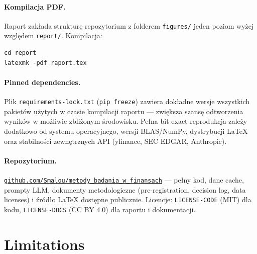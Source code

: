 \documentclass[11pt,a4paper]{article}
\begin{document}
\paragraph{Kompilacja PDF.} Raport zakłada strukturę repozytorium z folderem
\texttt{figures/} jeden poziom wyżej względem \texttt{report/}. Kompilacja:
\begin{verbatim}
cd report
latexmk -pdf raport.tex
\end{verbatim}

\paragraph{Pinned dependencies.} Plik \texttt{requirements-lock.txt}
(\texttt{pip freeze}) zawiera dokładne wersje wszystkich pakietów użytych
w czasie kompilacji raportu --- zwiększa szansę odtworzenia wyników
w możliwie zbliżonym środowisku. Pełna bit-exact reprodukcja zależy
dodatkowo od systemu operacyjnego, wersji BLAS/NumPy, dystrybucji LaTeX
oraz stabilności zewnętrznych API (yfinance, SEC EDGAR, Anthropic).

\paragraph{Repozytorium.}
\href{https://github.com/Smalou/metody_badania_w_finansach}{\texttt{github.com/Smalou/metody\_badania\_w\_finansach}}
--- pełny kod, dane cache, prompty LLM, dokumenty metodologiczne
(pre-registration, decision log, data licenses) i źródło LaTeX
dostępne publicznie. Licencje: \texttt{LICENSE-CODE} (MIT) dla kodu,
\texttt{LICENSE-DOCS} (CC BY 4.0) dla raportu i dokumentacji.

\section{Limitations}
\label{sec:limit}
\end{document}
